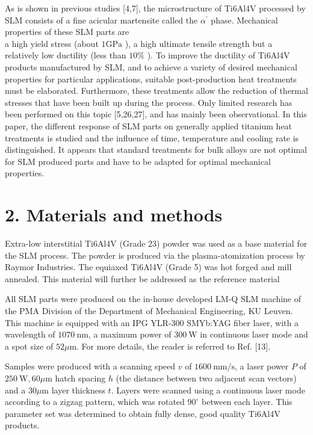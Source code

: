 \documentclass[10pt]{article}
\begin{document}
As is shown in previous studies [4,7], the microstructure of Ti6Al4V processed by SLM consists of a fine acicular martensite called the $\alpha^{\prime}$ phase. Mechanical properties of these SLM parts are\\
a high yield stress (about $1 \mathrm{GPa}$ ), a high ultimate tensile strength but a relatively low ductility (less than $10 \%$ ). To improve the ductility of Ti6Al4V products manufactured by SLM, and to achieve a variety of desired mechanical properties for particular applications, suitable post-production heat treatments must be elaborated. Furthermore, these treatments allow the reduction of thermal stresses that have been built up during the process. Only limited research has been performed on this topic [5,26,27], and has mainly been observational. In this paper, the different response of SLM parts on generally applied titanium heat treatments is studied and the influence of time, temperature and cooling rate is distinguished. It appears that standard treatments for bulk alloys are not optimal for SLM produced parts and have to be adapted for optimal mechanical properties.

\section*{2. Materials and methods}
Extra-low interstitial Ti6Al4V (Grade 23) powder was used as a base material for the SLM process. The powder is produced via the plasma-atomization process by Raymor Industries. The equiaxed Ti6Al4V (Grade 5) was hot forged and mill annealed. This material will further be addressed as the reference material

All SLM parts were produced on the in-house developed LM-Q SLM machine of the PMA Division of the Department of Mechanical Engineering, KU Leuven. This machine is equipped with an IPG YLR-300 SMYb:YAG fiber laser, with a wavelength of $1070 \mathrm{~nm}$, a maximum power of $300 \mathrm{~W}$ in continuous laser mode and a spot size of $52 \mu \mathrm{m}$. For more details, the reader is referred to Ref. [13].

Samples were produced with a scanning speed $v$ of $1600 \mathrm{~mm} / \mathrm{s}$, a laser power $P$ of $250 \mathrm{~W}, 60 \mu \mathrm{m}$ hatch spacing $h$ (the distance between two adjacent scan vectors) and a $30 \mu \mathrm{m}$ layer thickness $t$. Layers were scanned using a continuous laser mode according to a zigzag pattern, which was rotated $90^{\circ}$ between each layer. This parameter set was determined to obtain fully dense, good quality Ti6Al4V products.
\end{document}
